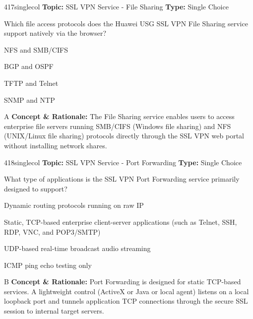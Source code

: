 \begin{qcard}{417}{singlecol}
\textcolor{darkslate!75}{\small\textbf{Topic:} SSL VPN Service - File Sharing \hfill \textbf{Type:} Single Choice}\vspace{0.4em}\par
Which file access protocols does the Huawei USG SSL VPN File Sharing service support natively via the browser?
\begin{qoptions}
\item NFS and SMB/CIFS
\item BGP and OSPF
\item TFTP and Telnet
\item SNMP and NTP
\end{qoptions}
\end{qcard}
\nopagebreak
\begin{explainbox}{A}
\textbf{Concept \& Rationale:} The File Sharing service enables users to access enterprise file servers running SMB/CIFS (Windows file sharing) and NFS (UNIX/Linux file sharing) protocols directly through the SSL VPN web portal without installing network shares.
\end{explainbox}

\begin{qcard}{418}{singlecol}
\textcolor{darkslate!75}{\small\textbf{Topic:} SSL VPN Service - Port Forwarding \hfill \textbf{Type:} Single Choice}\vspace{0.4em}\par
What type of applications is the SSL VPN Port Forwarding service primarily designed to support?
\begin{qoptions}
\item Dynamic routing protocols running on raw IP
\item Static, TCP-based enterprise client-server applications (such as Telnet, SSH, RDP, VNC, and POP3/SMTP)
\item UDP-based real-time broadcast audio streaming
\item ICMP ping echo testing only
\end{qoptions}
\end{qcard}
\nopagebreak
\begin{explainbox}{B}
\textbf{Concept \& Rationale:} Port Forwarding is designed for static TCP-based services. A lightweight control (ActiveX or Java or local agent) listens on a local loopback port and tunnels application TCP connections through the secure SSL session to internal target servers.
\end{explainbox}

